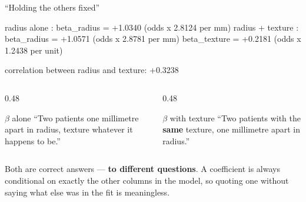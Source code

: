 \documentclass[aspectratio=169]{beamer}
\begin{document}
\begin{frame}[fragile,shrink=8]{``Holding the others fixed''}
\begin{outblk}
radius alone          : beta_radius = +1.0340   (odds x 2.8124 per mm)
radius + texture      : beta_radius = +1.0571   (odds x 2.8781 per mm)
                        beta_texture = +0.2181  (odds x 1.2438 per unit)

correlation between radius and texture: +0.3238
\end{outblk}
\vspace{0.2em}
\begin{columns}[T]
  \begin{column}{0.48\textwidth}
    \begin{block}{$\beta$ alone}
      \small ``Two patients one millimetre apart in radius, texture whatever
      it happens to be.''
    \end{block}
  \end{column}
  \begin{column}{0.48\textwidth}
    \begin{block}{$\beta$ with texture}
      \small ``Two patients with the \textbf{same} texture, one millimetre
      apart in radius.''
    \end{block}
  \end{column}
\end{columns}
\vspace{0.2em}
\begin{center}\small
  Both are correct answers --- \textbf{to different questions}. A coefficient
  is always conditional on exactly the other columns in the model, so quoting
  one without saying what else was in the fit is meaningless.
\end{center}
\end{frame}
\end{document}
